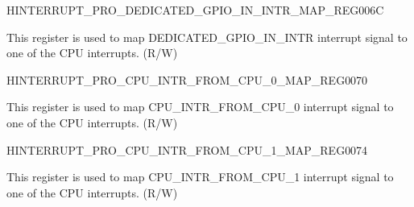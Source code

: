 \begin{register}{H}{INTERRUPT\_PRO\_DEDICATED\_GPIO\_IN\_INTR\_MAP\_REG}{\hexprefix{}006C}\label{regdesc:INTERRUPTPRODEDICATEDGPIOININTRMAPREG}
%
%
\regnewline%
\begin{regdesc}\begin{reglist}
\label{fielddesc:INTERRUPTPRODEDICATEDGPIOININTRMAP}\item [INTERRUPT\_PRO\_DEDICATED\_GPIO\_IN\_INTR\_MAP] This register is used to map DEDICATED\_GPIO\_IN\_INTR interrupt signal to one of the CPU interrupts. (R/W)
\end{reglist}\end{regdesc}
\end{register}


\begin{register}{H}{INTERRUPT\_PRO\_CPU\_INTR\_FROM\_CPU\_0\_MAP\_REG}{\hexprefix{}0070}\label{regdesc:INTERRUPTPROCPUINTRFROMCPU0MAPREG}
%
%
\regnewline%
\begin{regdesc}\begin{reglist}
\label{fielddesc:INTERRUPTPROCPUINTRFROMCPU0MAP}\item [INTERRUPT\_PRO\_CPU\_INTR\_FROM\_CPU\_0\_MAP] This register is used to map CPU\_INTR\_FROM\_CPU\_0 interrupt signal to one of the CPU interrupts. (R/W)
\end{reglist}\end{regdesc}
\end{register}


\begin{register}{H}{INTERRUPT\_PRO\_CPU\_INTR\_FROM\_CPU\_1\_MAP\_REG}{\hexprefix{}0074}\label{regdesc:INTERRUPTPROCPUINTRFROMCPU1MAPREG}
%
%
\regnewline%
\begin{regdesc}\begin{reglist}
\label{fielddesc:INTERRUPTPROCPUINTRFROMCPU1MAP}\item [INTERRUPT\_PRO\_CPU\_INTR\_FROM\_CPU\_1\_MAP] This register is used to map CPU\_INTR\_FROM\_CPU\_1 interrupt signal to one of the CPU interrupts. (R/W)
\end{reglist}\end{regdesc}
\end{register}


